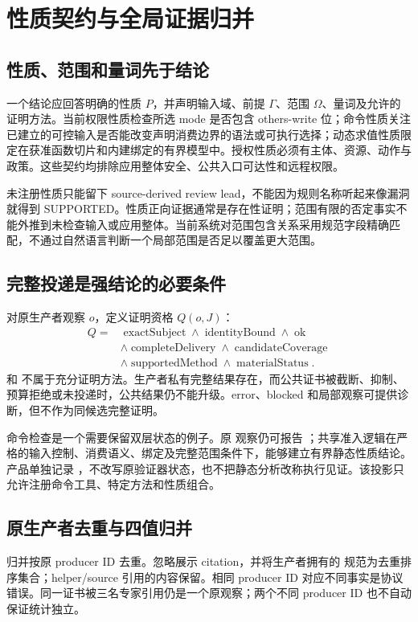 \section{性质契约与全局证据归并}
\label{sec:reduction}
\subsection{性质、范围和量词先于结论}
一个结论应回答明确的性质 $P$，并声明输入域、前提 $\Gamma$、范围 $\Omega$、量词及允许的证明方法。当前权限性质检查所选 mode 是否包含 others-write 位；命令性质关注已建立的可控输入是否能改变声明消费边界的语法或可执行选择；动态求值性质限定在获准函数切片和内建绑定的有界模型中。授权性质必须有主体、资源、动作与政策。这些契约均排除应用整体安全、公共入口可达性和远程权限。

未注册性质只能留下 source-derived review lead，不能因为规则名称听起来像漏洞就得到 SUPPORTED。性质正向证据通常是存在性证明；范围有限的否定事实不能外推到未检查输入或应用整体。当前系统对范围包含关系采用规范字段精确匹配，不通过自然语言判断一个局部范围是否足以覆盖更大范围。

\subsection{完整投递是强结论的必要条件}
对原生产者观察 $o$，定义证明资格 $Q(o,J)$：
\begin{equation}\begin{aligned}
Q={}&\operatorname{exactSubject}\land\operatorname{identityBound}\land\operatorname{ok}\\
&\land\operatorname{completeDelivery}\land\operatorname{candidateCoverage}\\
&\land\operatorname{supportedMethod}\land\operatorname{materialStatus}.
\end{aligned}\end{equation}
 和  不属于充分证明方法。生产者私有完整结果存在，而公共证书被截断、抑制、预算拒绝或未投递时，公共结果仍不能升级。error、blocked 和局部观察可提供诊断，但不作为同候选完整证明。

命令检查是一个需要保留双层状态的例子。原  观察仍可报告 ；共享准入逻辑在严格的输入控制、消费语义、绑定及完整范围条件下，能够建立有界静态性质结论。产品单独记录 ，不改写原验证器状态，也不把静态分析改称执行见证。该投影只允许注册命令工具、特定方法和性质组合。

\subsection{原生产者去重与四值归并}
归并按原 producer ID 去重。忽略展示 citation，并将生产者拥有的  规范为去重排序集合；helper/source 引用的内容保留。相同 producer ID 对应不同事实是协议错误。同一证书被三名专家引用仍是一个原观察；两个不同 producer ID 也不自动保证统计独立。

